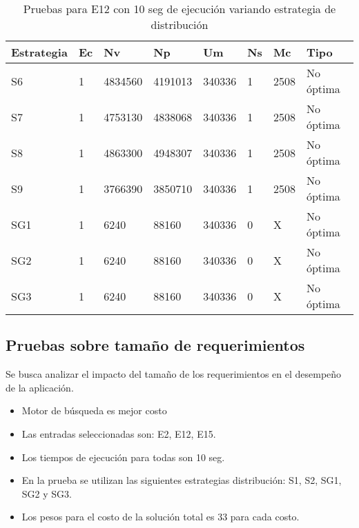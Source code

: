 \begin{center}
\begin{longtable}{|p{3cm}|p{1.0cm}|p{1.6cm}|p{1.6cm}|p{1.1cm}|p{1.1cm}|p{1.1cm}|p{2.7cm}|}
	\caption{Pruebas para E12 con 10 seg de ejecución variando estrategia de distribución} \\
	\hline
	\cellcolor[gray]{0.9} \textbf{Estrategia} & \cellcolor[gray]{0.9}\textbf{Ec} & \cellcolor[gray]{0.9}\textbf{Nv} & \cellcolor[gray]{0.9}\textbf{Np} & \cellcolor[gray]{0.9}\textbf{Um} & \cellcolor[gray]{0.9}\textbf{Ns} &  \cellcolor[gray]{0.9}\textbf{Mc} & \cellcolor[gray]{0.9}\textbf{Tipo}\\	\hline
	S6& 1 &4834560  &4191013 &340336  &1 &2508&No óptima \\
	\hline
	S7& 1 &4753130  &4838068 &340336  &1 &2508&No óptima \\
	\hline
	S8& 1 &4863300  &4948307 &340336  &1 &2508&No óptima \\
	\hline
	S9& 1 &3766390  &3850710 &340336  &1 &2508&No óptima \\
	\hline
	SG1& 1 &6240  &88160 &340336  &0 &X&No óptima \\
	\hline
	SG2& 1 &6240  &88160 &340336  &0 &X&No óptima \\
	\hline
	SG3& 1 &6240  &88160 &340336  &0 &X&No óptima \\
	\hline
\end{longtable}	
\end{center}
	
\subsection{Pruebas sobre tamaño de requerimientos}

Se busca analizar el impacto del tamaño de los requerimientos en el desempeño de la aplicación.

\begin{itemize}
	\item Motor de búsqueda es mejor costo
	\item Las entradas seleccionadas son: E2, E12, E15.	
	\item Los tiempos de ejecución para todas son 10 seg.
	\item En la prueba se utilizan las siguientes estrategias distribución: S1, S2, SG1, SG2 y SG3.
	\item Los pesos para el costo de la solución total es 33 para cada costo.
\end{itemize}


